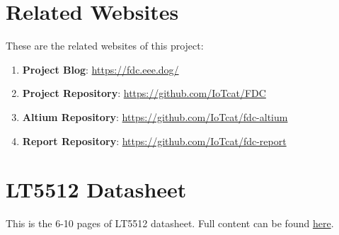 \documentclass[12pt, a4paper]{report}
\begin{document}
\chapter{Related Websites}
These are the related websites of this project:
\begin{enumerate}
 \item \textbf{Project Blog}: \href{https://fdc.eee.dog/}{https://fdc.eee.dog/}
 \item \textbf{Project Repository}: \href{https://github.com/IoTcat/FDC}{https://github.com/IoTcat/FDC}
 \item \textbf{Altium Repository}: \href{https://github.com/IoTcat/fdc-altium}{https://github.com/IoTcat/fdc-altium}
 \item \textbf{Report Repository}: \href{https://github.com/IoTcat/fdc-report}{https://github.com/IoTcat/fdc-report}
 \end{enumerate}

\chapter{LT5512 Datasheet}

This is the 6-10 pages of LT5512 datasheet. Full content can be found \href{https://www.analog.com/media/en/technical-documentation/data-sheets/5512fa.pdf}{here}.


\end{document}
